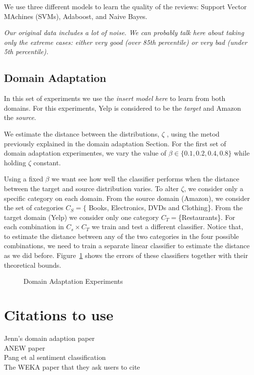 \documentclass[letterpaper]{article}
\begin{document}
We use three different models to learn the quality of the reviews:
Support Vector MAchines (SVMs), Adaboost, and Naive Bayes.

\emph{Our original data includes a lot of noise. We can probably talk
  here about taking only the extreme cases: either very good (over
  85th percentile) or very bad (under 5th percentile).}

\subsection{Domain Adaptation}
\label{sec:domain-adaptation}

In this set of experiments we use the \emph{insert model here} to
learn from both domains. For this experiments, Yelp is considered to be
the \emph{target} and Amazon the \emph{source}.

We estimate the distance between the distributions, $\zeta$ , using the metod
previously explained in the domain adaptation Section. For the first
set of domain adaptation experimentes, we vary the value of $\beta \in
\{0.1, 0.2, 0.4, 0.8\}$ while holding $\zeta$ constant.

Using a fixed $\beta$ we want see how well the classifier performs
when the distance between the target and source distribution
varies. To alter $\zeta$, we consider only a specific category on each
domain. From the source domain (Amazon), we consider the set of
categories $C_S=\{$ Books, Electronics, DVDs and Clothing\}. From the
target domain (Yelp) we consider only one category
$C_T=$\{Restaurants\}. For each combination in $C_s\times C_T$ we train
and test a different classifier. Notice that, to estimate the distance
between any of the two categories in the four possible combinations,
we need to train a separate linear classifier to estimate the distance
as we did before. Figure~\ref{fig:domain-adaptation} shows the errors
of these classifiers together with their theoretical bounds.

\begin{figure}
  \centering
  
  \caption{Domain Adaptation Experiments}
  \label{fig:domain-adaptation}
\end{figure}

\section{Citations to use}
Jenn's domain adaption paper \cite{JennLearnDiffDomains}\\
ANEW paper \cite{DoddsANEWPaper}\\
Pang et al sentiment classification \cite{PangSentimentClassification}\\
The WEKA paper that they ask users to cite \cite{weka} \\



\end{document}
